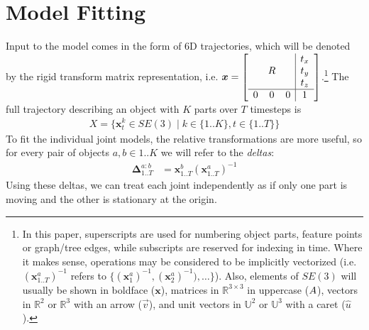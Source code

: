 \documentclass[letterpaper, 10 pt, conference]{ieeeconf}  %
\newcommand\mat[2]{\ensuremath{\left[\begin{array}{#1}#2\end{array}\right]}}
\def\xmat{\uppercase}    \def\xmatstr{in uppercase}
\def\xvec{\vec}          \def\xvecstr{with an arrow}
\def\xuv{\hat}           \def\xuvstr{with a caret}
\def\xse{\bm}            \def\xsestr{in boldface}
\begin{document}
\section{Model Fitting}
Input to the model comes in the form of 6D trajectories, which will be denoted by the rigid transform matrix representation, i.e. $\xse{x} = \mat{ccc|c}{&&& t_x \\ & \xmat{r} && t_y \\ &&& t_z \\\hline 0 & 0 & 0 & 1}$.\footnote{In this paper, superscripts are used for numbering object parts, feature points or graph/tree edges, while subscripts are reserved for indexing in time. Where it makes sense, operations may be considered to be implicitly vectorized (i.e. $(\xse{x}_{1..T}^a)^{-1}$ refers to $\{(\xse{x}_1^a)^{-1}, (\xse{x}_2^a)^{-1}), \dots\}$). Also, elements of $SE(3)$ will usually be shown \xsestr{} ($\xse{x}$), matrices in $\mathbb{R}^{3 \times 3}$ \xmatstr{} ($\xmat{a}$), vectors in $\mathbb{R}^2$ or $\mathbb{R}^3$ \xvecstr{} ($\xvec{v}$), and unit vectors in $\mathbb{U}^2$ or $\mathbb{U}^3$ \xuvstr{ } ($\xuv{u}$).} The full trajectory describing an object with $K$ parts over $T$ timesteps is
\begin{align}
  X = \{ \xse{x}_t^k \in SE(3) \mid k \in \{1..K\}, t \in \{1..T\} \}
\end{align}
To fit the individual joint models, the relative transformations are more useful, so for every pair of objects $a, b \in 1..K$ we will refer to the \emph{deltas}:
\begin{align}
  \xse{\Delta}_{1..T}^{a:b} &= \xse{x}_{1..T}^{b} (\xse{x}_{1..T}^{a})^{-1}
\end{align}
Using these deltas, we can treat each joint independently as if only one part is moving and the other is stationary at the origin.
\end{document}
